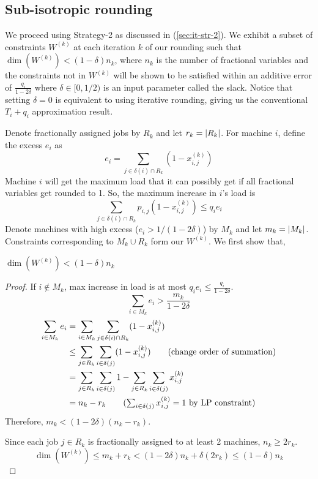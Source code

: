 \subsection{Sub-isotropic rounding}

We proceed using Strategy-2 as discussed in (\ref{sec:it-str-2}).
We exhibit a subset of constraints $W^{(k)}$ at each iteration $k$ of our rounding such that
$\dim(W^{(k)}) < (1-\delta)n_k$, where $n_k$ is the number of fractional variables
and the constraints not in $W^{(k)}$ will be shown to be satisfied
within an additive error of $\frac{q_i}{1-2\delta}$ where $\delta \in [0,1/2)$
is an input parameter called the slack.
Notice that setting $\delta = 0$ is equivalent to using iterative rounding,
giving us the conventional $T_i + q_i$ approximation result.

Denote fractionally assigned jobs by $R_k$ and let $r_k = \left\lvert R_k \right\rvert$.
For machine $i$, define the excess $e_i$ as
\[ e_i = \sum_{j \in \delta(i) \cap R_k} (1 - x_{i,j}^{(k)}) \]
Machine $i$ will get the maximum load that it can possibly get if
all fractional variables get rounded to 1. So, the maximum increase in $i$'s load is
\[ \sum_{j \in \delta(i) \cap R_k} p_{i,j} (1-x_{i,j}^{(k)}) \leq q_i e_i \]
Denote machines with high excess ($e_i > 1/(1-2\delta)$) by $M_k$ and let $m_k = \left\lvert M_k \right\rvert$.
Constraints corresponding to $M_k \cup R_k$ form our $W^{(k)}$. We first show that,
\begin{lemma}
$\dim(W^{(k)}) < (1-\delta)n_k$
\end{lemma}
\begin{proof}
If $i \not\in M_k$, max increase in load is at most $q_i e_i \le \frac{q_i}{1-2\delta}$.
\[ \sum_{i \in M_k} e_i > \frac{m_k}{1-2\delta} \]
\begin{align*}
\sum_{i \in M_k} e_i
&= \sum_{i \in M_k} \sum_{j \in \delta(i) \cap R_k} (1 - x_{i,j}^{(k)})
\\ &\leq \sum_{j \in R_k} \sum_{i \in \delta(j)} (1 - x_{i,j}^{(k)})  \tag{change order of summation}
\\ &= \sum_{j \in R_k} \sum_{i \in \delta(j)} 1 - \sum_{j \in R_k} \sum_{i \in \delta(j)} x_{i,j}^{(k)}
\\ &= n_k - r_k \tag{$\sum_{i \in \delta(j)} x_{i,j}^{(k)} = 1$ by LP constraint}
\end{align*}
Therefore, $m_k < (1-2\delta)(n_k - r_k)$.

Since each job $j \in R_k$ is fractionally assigned to at least 2 machines, $n_k \geq 2r_k$.
\[ \dim(W^{(k)}) \le m_k + r_k < (1-2\delta)n_k + \delta(2r_k) \le (1-\delta)n_k \]
\end{proof}

